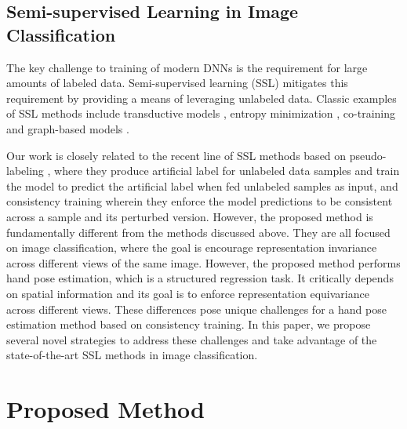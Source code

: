 \documentclass{article}
\begin{document}
\subsection{Semi-supervised Learning in Image Classification}
The key challenge to training of modern DNNs is the requirement for large amounts of labeled data. Semi-supervised learning (SSL) mitigates this requirement by providing a means of leveraging unlabeled data. Classic examples of SSL methods include transductive models \cite{demiriz1999semi,gammerman2013learning,joachims1999transductive}, entropy minimization \cite{grandvalet2005semi}, co-training \cite{blum1998combining,nigam2000analyzing} and graph-based models \cite{belkin2004regularization,blum2001learning,he2018amc,wang2007label,li2021comatch}.
\par
Our work is closely related to the recent line of SSL methods based on pseudo-labeling \cite{arazo2020pseudo,han2019deep,cascante2020curriculum}, where they produce artificial label for unlabeled data samples and train the model to predict the artificial label when fed unlabeled samples as input, and consistency training \cite{sohn2020fixmatch,xie2019unsupervised,gong2021alphamatch} wherein they enforce the model predictions to be consistent across a sample and its perturbed version. However, the proposed method is fundamentally different from the methods discussed above. They are all focused on image classification, where the goal is encourage representation invariance across different views of the same image. However, the proposed method performs hand pose estimation, which is a structured regression task. It critically depends on spatial information and its goal is to enforce representation equivariance across different views. These differences pose unique challenges for a hand pose estimation method based on consistency training. In this paper, we propose several novel strategies to address these challenges and take advantage of the state-of-the-art SSL methods in image classification.

\section{Proposed Method}
\end{document}
